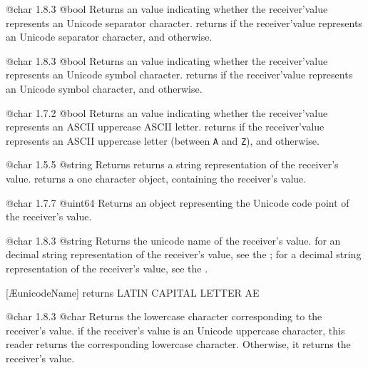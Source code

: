 {@char}
{1.8.3}
{@bool}
{Returns an  value indicating whether the receiver'value represents an Unicode separator character.}
{returns  if the receiver'value represents an Unicode separator character, and  otherwise.}






{@char}
{1.8.3}
{@bool}
{Returns an  value indicating whether the receiver'value represents an Unicode symbol character.}
{returns  if the receiver'value represents an Unicode symbol character, and  otherwise.}









{@char}
{1.7.2}
{@bool}
{Returns an  value indicating whether the receiver'value represents an ASCII uppercase ASCII letter.}
{returns  if the receiver'value represents an ASCII uppercase letter (between \texttt{\textquotesingle A\textquotesingle} and \texttt{\textquotesingle Z\textquotesingle}), and  otherwise.}





{@char}
{1.5.5}
{@string}
{Returns returns a string representation of the receiver's value.}
{returns a one character  object, containing the receiver's value.}




{@char}
{1.7.7}
{@uint64}
{Returns an  object representing the Unicode code point of the receiver's value.}
{}




{@char}
{1.8.3}
{@string}
{Returns the unicode name of the receiver's value.}
{for an decimal string representation of the receiver's value, see the ; for a decimal string representation of the receiver's value, see the .}

\exempleUneLigne
{}
{[\textquotesingle \AE \textquotesingle unicodeName] returns \textquotedbl LATIN CAPITAL LETTER AE \textquotedbl}




{@char}
{1.8.3}
{@char}
{Returns the lowercase character corresponding to the receiver's value.}
{if the receiver's value is an Unicode uppercase character, this reader returns the corresponding lowercase character. Otherwise, it returns the receiver's value.}

